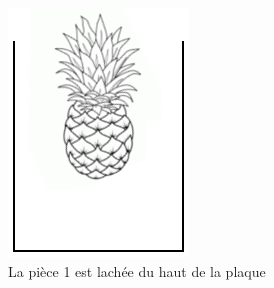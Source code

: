 \begin{figure}[!htb]
    \centering
    \begin{subfigure}{.4\linewidth}
        \centering
        \includegraphics[width=\linewidth]{img/FreezeA.png}
        \caption{La pièce 1 est lachée du haut de la plaque}
    \end{subfigure}%
    ~ 
    \begin{subfigure}{.4\linewidth}
        \centering

\end{subfigure}
\end{figure}
